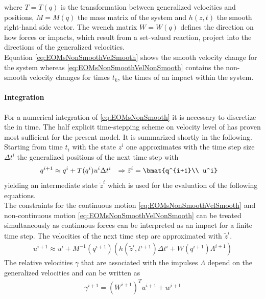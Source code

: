%
where $T = T(q)$ is the transformation between generalized velocities and positions, $M = M(q)$ the mass matrix of the system and $h(z,t)$ the smooth right-hand side vector. 
The wrench matrix $W = W(q)$ defines the direction on how forces or impacts, which result from a set-valued reaction, project into the directions of the generalized velocities.\\ 
Equation \eqref{eq:EOMsNonSmoothVelSmooth} shows the smooth velocity change for the system whereas \eqref{eq:EOMsNonSmoothVelNonSmooth} contains the non-smooth velocity changes for times $t_k$, the times of an impact within the system.\par

\paragraph{Integration}
For a numerical integration of \eqref{eq:EOMsNonSmooth} it is necessary to discretize the \EOMs in time. 
The half explicit time-stepping scheme on velocity level of \cite[section 4.4.1]{forg_mehrkorpersysteme_2007} has proven most sufficient for the present model.
It is summarized shortly in the following.\\
Starting from time $t_i$ with the state $z^i$ one approximates with the time step size $\Delta t^i$ the generalized positions of the next time step with
%
\begin{align}
  \label{eq:IntegrationOfGeneralizedPositions}
  q^{i+1} &\approx q^i + T(q^i) u^{i} \Delta t^i &\Rightarrow \tilde{z}^{i} &= \bmat{q^{i+1}\\ u^i}
\end{align}
%
yielding an intermediate state $\tilde{z}^{i}$ which is used for the evaluation of the following equations.\\
The constraints for the continuous motion \eqref{eq:EOMsNonSmoothVelSmooth} and non-continuous motion \eqref{eq:EOMsNonSmoothVelNonSmooth} can be treated simultaneously as continuous forces can be interpreted as an impact for a finite time step.
The velocities of the next time step are approximated with $\tilde{z}^{i}$.
%
\begin{align}
  \label{eq:IntegrationOfGeneralizedVelocities}
  u^{i+1} \approx u^i + M^{-1}(q^{i+1}) \left( h(\tilde{z}^{i},t^{i+1}) \Delta t^i + W(q^{i+1}) \Lambda^{i+1}\right)
\end{align}
%
The relative velocities $\gamma$ that are associated with the impulses $\Lambda$ depend on the generalized velocities and can be written as
%
\begin{align}
  \label{eq:IntegrationOfRelativeVelocities}
  \gamma^{i+1} = (W^{i+1})^T u^{i+1} + w^{i+1}
\end{align}
